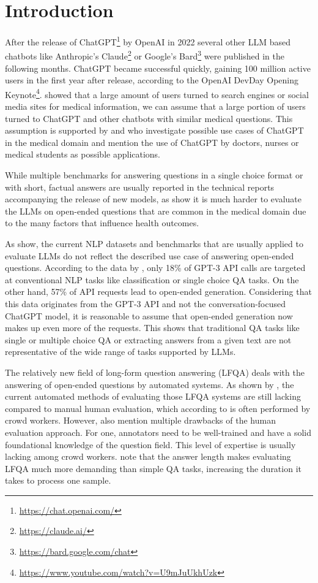 \chapter{Introduction}\label{structure}
After the release of ChatGPT\footnote{\url{https://chat.openai.com/}} by OpenAI in 2022 several other LLM based chatbots like Anthropic's Claude\footnote{\url{https://claude.ai/}} or Google's Bard\footnote{\url{https://bard.google.com/chat}} were published in the following months.
ChatGPT became successful quickly, gaining 100 million active users in the first year after release, according to the OpenAI DevDay Opening Keynote\footnote{\url{https://www.youtube.com/watch?v=U9mJuUkhUzk}}.
\cite{de:2014:seeking} showed that a large amount of users turned to search engines or social media sites for medical information, we can assume that a large portion of users turned to ChatGPT and other chatbots with similar medical questions.
This assumption is supported by \cite{dave:2023:chatgpt} and \cite{khan:2023:chatgpt} who investigate possible use cases of ChatGPT in the medical domain and mention the use of ChatGPT by doctors, nurses or medical students as possible applications.

While multiple benchmarks for answering questions in a single choice format or with short, factual answers are usually reported in the technical reports accompanying the release of new models, as \cite{xu:2023:A} show it is much harder to evaluate the LLMs on open-ended questions that are common in the medical domain due to the many factors that influence health outcomes.

As \cite{ouyang:2022:Training} show, the current NLP datasets and benchmarks that are usually applied to evaluate LLMs do not reflect the described use case of answering open-ended questions.
According to the data by \cite{ouyang:2022:Training}, only 18\% of GPT-3 API calls are targeted at conventional NLP tasks like classification or single choice QA tasks.
On the other hand, 57\% of API requests lead to open-ended generation.
Considering that this data originates from the GPT-3 API and not the conversation-focused ChatGPT model, it is reasonable to assume that open-ended generation now makes up even more of the requests.
This shows that traditional QA tasks like single or multiple choice QA or extracting answers from a given text are not representative of the wide range of tasks supported by LLMs.

The relatively new field of long-form question answering (LFQA) deals with the answering of open-ended questions by automated systems.
As shown by \cite{xu:2023:A}, the current automated methods of evaluating those LFQA systems are still lacking compared to manual human evaluation, which according to \cite{xu:2023:A} is often performed by crowd workers.
However, \cite{xu:2023:A} also mention multiple drawbacks of the human evaluation approach.
For one, annotators need to be well-trained and have a solid foundational knowledge of the question field.
This level of expertise is usually lacking among crowd workers.
\cite{krishna:2021:Hurdles} note that the answer length makes evaluating LFQA much more demanding than simple QA tasks, increasing the duration it takes to process one sample.

